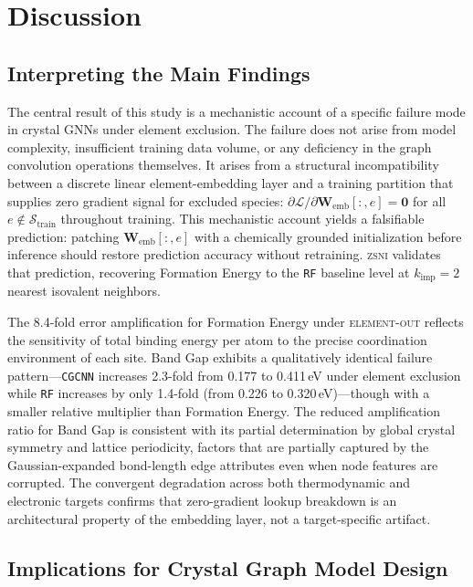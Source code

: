 \documentclass[final,5p,twocolumn,10pt]{elsarticle}
\newcommand{\mae}{\text{MAE}}
\newcommand{\elout}{\textsc{element-out}}
\newcommand{\cgcnn}{\texttt{CGCNN}}
\newcommand{\rf}{\texttt{RF}}
\newcommand{\zsni}{\textsc{zsni}}
\begin{document}
\section{Discussion}
\label{sec:discussion}

\subsection{Interpreting the Main Findings}

The central result of this study is a mechanistic account of a specific
failure mode in crystal GNNs under element exclusion. The failure does not
arise from model complexity, insufficient training data volume, or any
deficiency in the graph convolution operations themselves. It arises from
a structural incompatibility between a discrete linear element-embedding layer
and a training partition that supplies zero gradient signal for excluded species:
$\partial \mathcal{L}/\partial \bm{W}_{\text{emb}}[:,e] = \mathbf{0}$
for all $e \notin \mathcal{S}_{\text{train}}$ throughout training.
This mechanistic account yields a falsifiable prediction: patching
$\bm{W}_{\text{emb}}[:,e]$ with a chemically grounded initialization
before inference should restore prediction accuracy without retraining.
\zsni{} validates that prediction, recovering Formation Energy
\mae{} to the \rf{} baseline level at $k_{\text{imp}}=2$ nearest isovalent neighbors.

The 8.4-fold error amplification for Formation Energy under \elout{}
reflects the sensitivity of total binding energy per atom to
the precise coordination environment of each site. Band Gap exhibits
a qualitatively identical failure pattern---\cgcnn{} \mae{} increases 2.3-fold
from 0.177 to 0.411\,eV under element exclusion while \rf{} increases
by only 1.4-fold (from 0.226 to 0.320\,eV)---though with a smaller relative
multiplier than Formation Energy. The reduced amplification ratio for Band Gap
is consistent with its partial determination by global crystal symmetry
and lattice periodicity, factors that are partially captured by the
Gaussian-expanded bond-length edge attributes even when node features are
corrupted. The convergent degradation across both thermodynamic and
electronic targets confirms that zero-gradient lookup breakdown is an
architectural property of the embedding layer, not a target-specific artifact.

\subsection{Implications for Crystal Graph Model Design}
\end{document}

